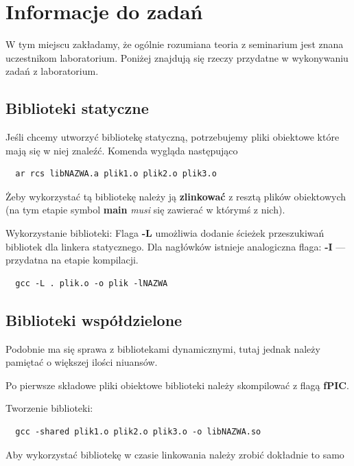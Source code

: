 \documentclass[12pt]{article}
\begin{document}

\tableofcontents
\pagebreak



\section{Informacje do zadań}
W tym miejscu zakładamy, że ogólnie rozumiana teoria z seminarium jest znana
uczestnikom laboratorium. Poniżej znajdują się rzeczy przydatne w wykonywaniu
zadań z laboratorium.
\subsection{Biblioteki statyczne}
Jeśli chcemy utworzyć bibliotekę statyczną, potrzebujemy pliki obiektowe które
mają się w niej znaleźć. Komenda wygląda następująco

\begin{lstlisting}
  ar rcs libNAZWA.a plik1.o plik2.o plik3.o
\end{lstlisting}
Żeby wykorzystać tą bibliotekę należy ją \textbf{zlinkować} z resztą plików
obiektowych (na tym etapie symbol \textbf{main} \textit{musi} się zawierać w
którymś z nich).

Wykorzystanie biblioteki: Flaga \textbf{-L} umożliwia dodanie ścieżek
przeszukiwań bibliotek dla linkera statycznego. Dla nagłówków istnieje
analogiczna flaga: \textbf{-I} --- przydatna na etapie kompilacji.

\begin{lstlisting}
  gcc -L . plik.o -o plik -lNAZWA
\end{lstlisting}

\subsection{Biblioteki współdzielone}
Podobnie ma się sprawa z bibliotekami dynamicznymi, tutaj jednak należy pamiętać
o większej ilości niuansów.

Po pierwsze składowe pliki obiektowe biblioteki należy skompilować z flagą
\textbf{fPIC}.

Tworzenie biblioteki:
\begin{lstlisting}
  gcc -shared plik1.o plik2.o plik3.o -o libNAZWA.so
\end{lstlisting}

Aby wykorzystać bibliotekę w czasie linkowania należy zrobić dokładnie to samo
\end{document}
